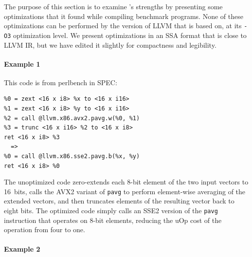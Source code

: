 The purpose of this section is to examine \minotaur's strengths by
presenting some optimizations that it found while compiling benchmark
programs.
%
None of these optimizations can be performed by the version of LLVM
that \minotaur{} is based on, at its \texttt{-O3} optimization level.
%
We present optimizations in an SSA format that is close to LLVM IR,
but we have edited it slightly for compactness and legibility.

\paragraph*{Example 1}

This code is from perlbench in SPEC:

{\begin{quoting}\begin{Verbatim}
%0 = zext <16 x i8> %x to <16 x i16>
%1 = zext <16 x i8> %y to <16 x i16>
%2 = call @llvm.x86.avx2.pavg.w(%0, %1)
%3 = trunc <16 x i16> %2 to <16 x i8>
ret <16 x i8> %3
  =>
%0 = call @llvm.x86.sse2.pavg.b(%x, %y)
ret <16 x i8> %0
\end{Verbatim}
\end{quoting}}

The unoptimized code zero-extends each 8-bit element of the two input
vectors to 16~bits, calls the AVX2 variant of \texttt{pavg} to perform
element-wise averaging of the extended vectors, and then truncates
elements of the resulting vector back to eight bits.
%
The optimized code simply calls an SSE2 version of the \texttt{pavg}
instruction that operates on 8-bit elements, reducing the uOp cost
of the operation from four to one.


\paragraph*{Example 2}

